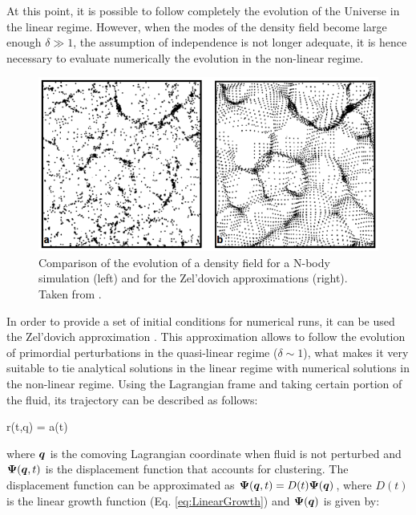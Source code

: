 \documentclass[a4,useAMS,usenatbib,usegraphicx,12pt]{article}
\begin{document}
At this point, it is possible to follow completely the evolution of the Universe
in the linear regime. However, when the modes of the density field become large
enough $\delta\gg 1$, the assumption of independence is not longer adequate, it 
is hence necessary to evaluate numerically the evolution in the non-linear 
regime.

\begin{figure}[h]
\centering

  \includegraphics[trim = 0mm 0mm 0mm 2mm, clip, keepaspectratio=true,
  width=0.4\textheight]{./figures/Zeldovich_Approximation.png}
  
  \caption{\small Comparison of the evolution of a density field for a 
  N-body simulation (left) and for the Zel'dovich approximations (right).
  Taken from \cite{longair2008}.}

  \label{fig:Zeldovich}

\end{figure}

In order to provide a set of initial conditions for numerical runs, it can be 
used the Zel'dovich approximation \citep{Zeldovich70}. This approximation allows
to follow the evolution of primordial perturbations in the quasi-linear regime 
($\delta \sim 1$), what makes it very suitable to tie analytical solutions in 
the linear regime with numerical solutions in the non-linear regime. Using the
Lagrangian frame and taking certain portion of the fluid, its trajectory can 
be described as follows:

{ \bds r(t,\bds q) = a(t) }

where $\boldsymbol{ q }$ is the comoving Lagrangian coordinate when fluid is not 
perturbed and $\boldsymbol{ \Psi }(\boldsymbol{ q }, t)$ is the displacement function that 
accounts for clustering. The displacement function can be approximated as 
$\boldsymbol{ \Psi }(\boldsymbol{ q }, t) = D(t)\boldsymbol{ \Psi }(\boldsymbol{ q })$, where $D(t)$ is the linear 
growth function (Eq. \ref{eq:LinearGrowth}) and $\boldsymbol{ \Psi }(\boldsymbol{ q })$ is given 
by:
\end{document}
